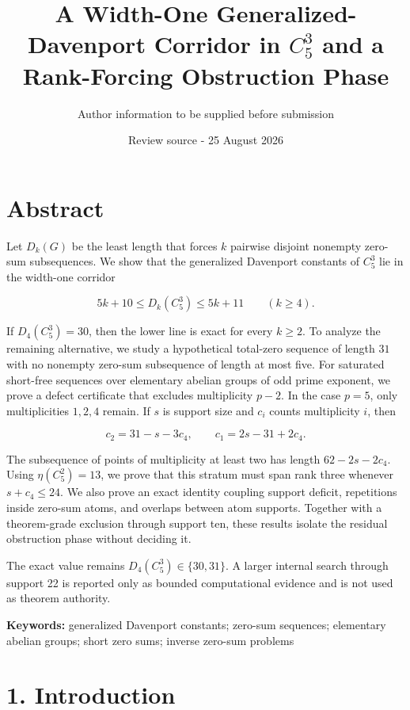 \documentclass[
  11pt,
]{article}
\title{A Width-One Generalized-Davenport Corridor in \(C_5^3\) and a Rank-Forcing Obstruction Phase}
\author{Author information to be supplied before submission}
\date{Review source - 25 August 2026}
\begin{document}
\maketitle

\hypertarget{abstract}{%
\section{Abstract}\label{abstract}}

Let \(D_k(G)\) be the least length that forces \(k\) pairwise disjoint
nonempty zero-sum subsequences. We show that the generalized Davenport
constants of \(C_5^3\) lie in the width-one corridor

\[
5k+10\le D_k(C_5^3)\le5k+11
\qquad(k\ge4).
\]

If \(D_4(C_5^3)=30\), then the lower line is exact for every \(k\ge2\).
To analyze the remaining alternative, we study a hypothetical total-zero
sequence of length \(31\) with no nonempty zero-sum subsequence of
length at most five. For saturated short-free sequences over elementary
abelian groups of odd prime exponent, we prove a defect certificate that
excludes multiplicity \(p-2\). In the case \(p=5\), only multiplicities
\(1,2,4\) remain. If \(s\) is support size and \(c_i\) counts
multiplicity \(i\), then

\[
c_2=31-s-3c_4,
\qquad
c_1=2s-31+2c_4.
\]

The subsequence of points of multiplicity at least two has length
\(62-2s-2c_4\). Using \(\eta(C_5^2)=13\), we prove that this stratum
must span rank three whenever \(s+c_4\le24\). We also prove an exact
identity coupling support deficit, repetitions inside zero-sum atoms,
and overlaps between atom supports. Together with a theorem-grade
exclusion through support ten, these results isolate the residual
obstruction phase without deciding it.

The exact value remains \(D_4(C_5^3)\in\{30,31\}\). A larger internal
search through support 22 is reported only as bounded computational
evidence and is not used as theorem authority.

\textbf{Keywords:} generalized Davenport constants; zero-sum sequences;
elementary abelian groups; short zero sums; inverse zero-sum problems

\hypertarget{introduction}{%
\section{1. Introduction}\label{introduction}}
\end{document}
